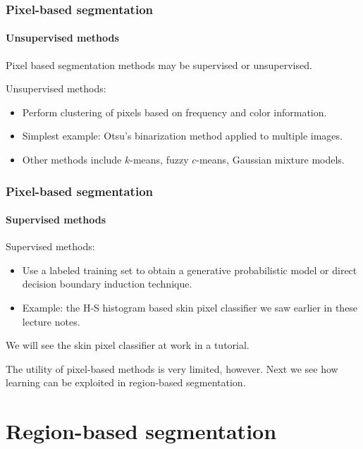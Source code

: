 \documentclass[aspectratio=169]{beamer}
\begin{document}
\begin{frame}
\frametitle{Pixel-based segmentation}
\framesubtitle{Unsupervised methods}

Pixel based segmentation methods may be \alert{supervised} or
\alert{unsupervised}.

\medskip

Unsupervised methods:
\begin{itemize}
\item Perform \alert{clustering} of pixels based on frequency and
  color information.
\item Simplest example: Otsu's binarization method applied to multiple
  images.
\item Other methods include $k$-means, fuzzy $c$-means, Gaussian
  mixture models.
\end{itemize}

\end{frame}


\begin{frame}
\frametitle{Pixel-based segmentation}
\framesubtitle{Supervised methods}

Supervised methods:
\begin{itemize}
\item Use a labeled training set to obtain a generative probabilistic 
  model or direct decision boundary induction technique.
\item Example: the H-S histogram based skin pixel classifier we saw earlier
  in these lecture notes.
\end{itemize}

\medskip

We will see the skin pixel classifier at work in a tutorial.

\medskip

The utility of pixel-based methods is very limited, however.  Next we
see how learning can be exploited in \alert{region-based segmentation}.

\end{frame}

\section{Region-based segmentation}
\end{document}

